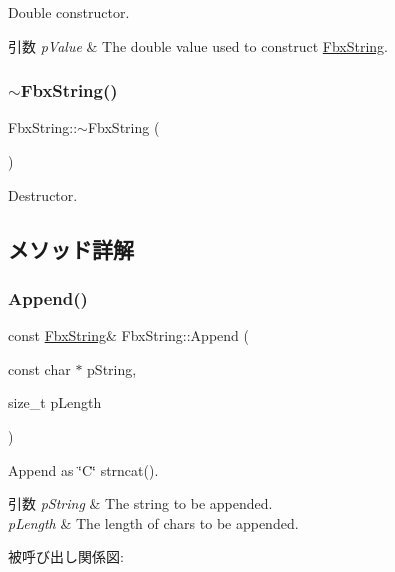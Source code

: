 Double constructor. 
\begin{DoxyParams}{引数}
{\em p\+Value} & The double value used to construct \hyperlink{class_fbx_string}{Fbx\+String}. \\
\hline
\end{DoxyParams}
\mbox{\label{class_fbx_string_a36df0b9249f7987f157291b6246b7662}} 
\subsubsection{\texorpdfstring{$\sim$\+Fbx\+String()}{~FbxString()}}
{\footnotesize\ttfamily Fbx\+String\+::$\sim$\+Fbx\+String (\begin{DoxyParamCaption}{ }\end{DoxyParamCaption})}



Destructor. 



\subsection{メソッド詳解}
\mbox{\label{class_fbx_string_a83fddd51fd69fee3f9dbde0e2caf6e94}} 
\subsubsection{\texorpdfstring{Append()}{Append()}}
{\footnotesize\ttfamily const \hyperlink{class_fbx_string}{Fbx\+String}\& Fbx\+String\+::\+Append (\begin{DoxyParamCaption}\item[{const char $\ast$}]{p\+String,  }\item[{size\+\_\+t}]{p\+Length }\end{DoxyParamCaption})}

Append as \char`\"{}\+C\char`\"{} strncat(). 
\begin{DoxyParams}{引数}
{\em p\+String} & The string to be appended. \\
\hline
{\em p\+Length} & The length of chars to be appended. \\
\hline
\end{DoxyParams}
被呼び出し関係図\+:
\mbox{\label{class_fbx_string_ac41dc796638cda32faebf887a88e769b}} 
